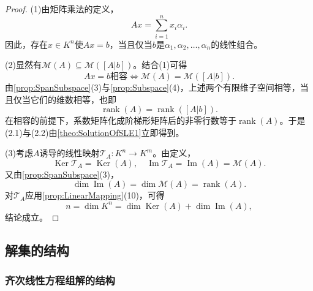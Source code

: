 \begin{proof}
	(1)由矩阵乘法的定义，
	\begin{equation*}
		Ax=\sum_{i=1}^{n}x_i\alpha_i.
	\end{equation*}
	因此，存在$x\in K^n$使$Ax=b$，当且仅当$b$是$\alpha_1,\alpha_2,\dots,\alpha_n$的线性组合。

	(2)显然有$\mathcal{M}(A)\subseteq\mathcal{M}([A|b])$。结合(1)可得
	\begin{equation*}
		Ax=b\text{相容}
		\iff\mathcal{M}(A)=\mathcal{M}([A|b]).
	\end{equation*}
	由\cref{prop:SpanSubspace}(3)与\cref{prop:Subspace}(4)，上述两个有限维子空间相等，当且仅当它们的维数相等，也即
	\begin{equation*}
		\operatorname{rank}(A)=\operatorname{rank}([A|b]).
	\end{equation*}
	在相容的前提下，系数矩阵化成阶梯形矩阵后的非零行数等于$\operatorname{rank}(A)$。于是(2.1)与(2.2)由\cref{theo:SolutionOfSLE1}立即得到。

	(3)考虑$A$诱导的线性映射$\mathcal{T}_A:K^n\longrightarrow K^m$。由定义，
	\begin{equation*}
		\operatorname{Ker}\mathcal{T}_A=\operatorname{Ker}(A),
		\quad
		\operatorname{Im}\mathcal{T}_A=\operatorname{Im}(A)=\mathcal{M}(A).
	\end{equation*}
	又由\cref{prop:SpanSubspace}(3)，
	\begin{equation*}
		\dim\operatorname{Im}(A)=\dim\mathcal{M}(A)=\operatorname{rank}(A).
	\end{equation*}
	对$\mathcal{T}_A$应用\cref{prop:LinearMapping}(10)，可得
	\begin{equation*}
		n=\dim K^n
		=\dim\operatorname{Ker}(A)+\dim\operatorname{Im}(A),
	\end{equation*}
	结论成立。
\end{proof}

\subsection{解集的结构}

\subsubsection{齐次线性方程组解的结构}

